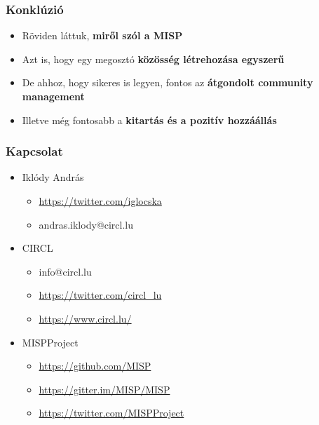 \begin{frame}
  \frametitle{Konklúzió}
  \begin{itemize}
      \item Röviden láttuk, {\bf miről szól a MISP}
      \item Azt is, hogy egy megosztó {\bf közösség létrehozása egyszerű}
      \item De ahhoz, hogy sikeres is legyen, fontos az {\bf átgondolt community management}
      \item Illetve még fontosabb a {\bf kitartás és a pozitív hozzáállás}
  \end{itemize}
\end{frame}

\begin{frame}
  \frametitle{Kapcsolat}
  \begin{itemize}
    \item Iklódy András
    \begin{itemize}
      \item \url{https://twitter.com/iglocska}
      \item andras.iklody@circl.lu
    \end{itemize}
    \item CIRCL
    \begin{itemize}
      \item info@circl.lu
      \item \url{https://twitter.com/circl_lu}
      \item \url{https://www.circl.lu/}
    \end{itemize}
    \item MISPProject 
    \begin{itemize}
      \item \url{https://github.com/MISP}
      \item \url{https://gitter.im/MISP/MISP}
      \item \url{https://twitter.com/MISPProject}
    \end{itemize}
  \end{itemize}
\end{frame}

